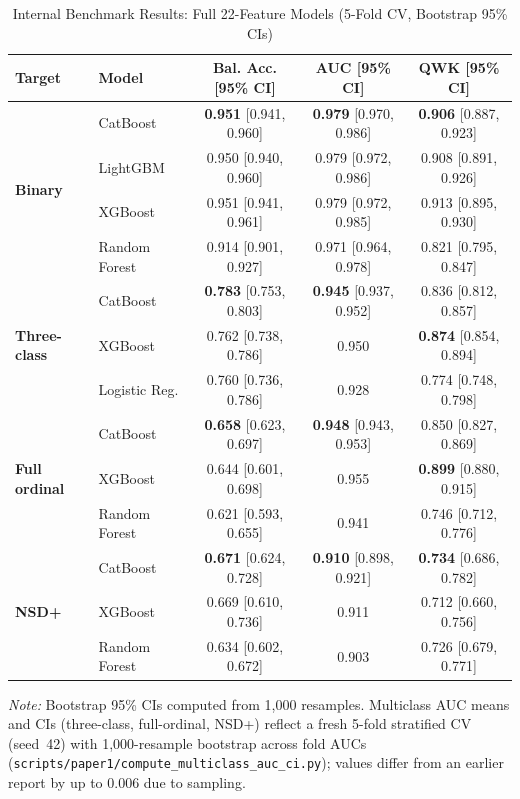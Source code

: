 \begin{table}[!t]
\caption{Internal Benchmark Results: Full 22-Feature Models (5-Fold CV, Bootstrap 95\% CIs)}
\label{p1:tab:benchmark}
\centering
\footnotesize
\setlength{\tabcolsep}{3pt}
\begin{tabular}{@{}llccc@{}}
\toprule
\textbf{Target} & \textbf{Model} & \textbf{Bal. Acc. [95\% CI]} & \textbf{AUC [95\% CI]} & \textbf{QWK [95\% CI]} \\
\midrule
\multirow{4}{*}{\textbf{Binary}}
 & CatBoost & \textbf{0.951} [0.941, 0.960] & \textbf{0.979} [0.970, 0.986] & \textbf{0.906} [0.887, 0.923] \\
 & LightGBM & 0.950 [0.940, 0.960] & 0.979 [0.972, 0.986] & 0.908 [0.891, 0.926] \\
 & XGBoost & 0.951 [0.941, 0.961] & 0.979 [0.972, 0.985] & 0.913 [0.895, 0.930] \\
 & Random Forest & 0.914 [0.901, 0.927] & 0.971 [0.964, 0.978] & 0.821 [0.795, 0.847] \\
\midrule
\multirow{3}{*}{\textbf{Three-class}}
 & CatBoost & \textbf{0.783} [0.753, 0.803] & \textbf{0.945} [0.937, 0.952] & 0.836 [0.812, 0.857] \\
 & XGBoost & 0.762 [0.738, 0.786] & 0.950 & \textbf{0.874} [0.854, 0.894] \\
 & Logistic Reg. & 0.760 [0.736, 0.786] & 0.928 & 0.774 [0.748, 0.798] \\
\midrule
\multirow{3}{*}{\textbf{Full ordinal}}
 & CatBoost & \textbf{0.658} [0.623, 0.697] & \textbf{0.948} [0.943, 0.953] & 0.850 [0.827, 0.869] \\
 & XGBoost & 0.644 [0.601, 0.698] & 0.955 & \textbf{0.899} [0.880, 0.915] \\
 & Random Forest & 0.621 [0.593, 0.655] & 0.941 & 0.746 [0.712, 0.776] \\
\midrule
\multirow{3}{*}{\textbf{NSD+}}
 & CatBoost & \textbf{0.671} [0.624, 0.728] & \textbf{0.910} [0.898, 0.921] & \textbf{0.734} [0.686, 0.782] \\
 & XGBoost & 0.669 [0.610, 0.736] & 0.911 & 0.712 [0.660, 0.756] \\
 & Random Forest & 0.634 [0.602, 0.672] & 0.903 & 0.726 [0.679, 0.771] \\
\bottomrule
\end{tabular}
\vspace{2pt}

\raggedright\scriptsize\textit{Note:} Bootstrap 95\% CIs computed from 1,000 resamples. Multiclass AUC means and CIs (three-class, full-ordinal, NSD+) reflect a fresh 5-fold stratified CV (seed~42) with 1{,}000-resample bootstrap across fold AUCs (\texttt{scripts/paper1/compute\_multiclass\_auc\_ci.py}); values differ from an earlier report by up to 0.006 due to sampling.
\end{table}

